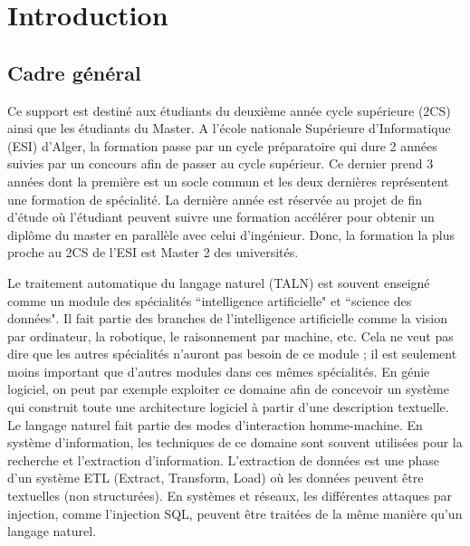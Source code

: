 \documentclass{KodeBook}
\begin{document}
		\mainmatter
	
\fi

\chapter*{Introduction}




\section*{Cadre général}

Ce support est destiné aux étudiants du deuxième année cycle supérieure (2CS) ainsi que les étudiants du Master.
A l'école nationale Supérieure d'Informatique (ESI) d'Alger, la formation passe par un cycle préparatoire qui dure
2 années suivies par un concours afin de passer au cycle supérieur.
Ce dernier prend 3 années dont la première est un socle commun et les deux dernières représentent une formation de spécialité.
La dernière année est réservée au projet de fin d'étude où l'étudiant peuvent suivre une formation accélérer pour obtenir un diplôme du master en parallèle avec celui d'ingénieur.
Donc, la formation la plus proche au 2CS de l'ESI est Master 2 des universités.

Le traitement automatique du langage naturel (TALN) est souvent enseigné comme un module des spécialités ``intelligence artificielle" et ``science des données".
Il fait partie des branches de l'intelligence artificielle comme la vision par ordinateur, la robotique, le raisonnement par machine, etc.
Cela ne veut pas dire que les autres spécialités n'auront pas besoin de ce module ; il est seulement moins important que d'autres modules dans ces mêmes spécialités.
En génie logiciel, on peut par exemple exploiter ce domaine afin de concevoir un système qui construit toute une architecture logiciel à partir d'une description textuelle.
Le langage naturel fait partie des modes d'interaction homme-machine.
En système d'information, les techniques de ce domaine sont souvent utilisées pour la recherche et l'extraction d'information.
L'extraction de données est une phase d'un système ETL (Extract, Transform, Load) où les données peuvent être textuelles (non structurées).
En systèmes et réseaux, les différentes attaques par injection, comme l'injection SQL, peuvent être traitées de la même manière qu'un langage naturel.
\end{document}
